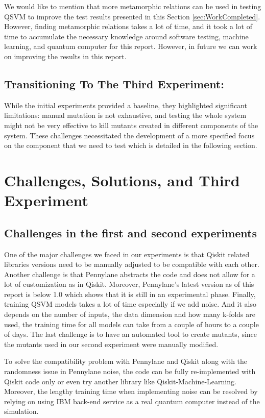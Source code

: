 \documentclass[12pt,a4paper]{article}
\begin{document}
We would like to mention that more metamorphic relations can be used in testing QSVM to improve the test results presented in this Section \ref{sec:WorkCompleted}. However, finding metamorphic relations takes a lot of time, and it took a lot of time to accumulate the necessary knowledge around software testing, machine learning, and quantum computer for this report. However, in future we can work on improving the results in this report.


	\subsection{Transitioning To The Third Experiment:} 

	While the initial experiments provided a baseline, they highlighted significant limitations: manual mutation is not exhaustive, and testing the whole system might not be very effective to kill mutants created in different components of the system. These challenges necessitated the development of a more specified focus on the component that we need to test which is detailed in the following section.
	

	\section{Challenges, Solutions, and Third Experiment}
	\label{sec:challenges_solutions}
	
	
	
	\subsection{Challenges in the first and second experiments}
	One of the major challenges we faced in our experiments is that Qiskit related libraries versions need to be manually adjusted to be compatible with each other. Another challenge is that Pennylane abstracts the code and does not allow for a lot of customization as in Qiskit. Moreover, Pennylane's latest version as of this report is below 1.0 which shows that it is still in an experimental phase. Finally, training QSVM models takes a lot of time especially if we add noise. And it also depends on the number of inputs, the data dimension and how many k-folds are used, the training time for all models can take from a couple of hours to a couple of days.	The last challenge is to have an automated tool to create mutants, since the mutants used in our second experiment were manually modified.
	
	To solve the compatibility problem with Pennylane and Qiskit along with the randomness issue in Pennylane noise, the code can be fully re-implemented with Qiskit code only or even try another library like Qiskit-Machine-Learning. Moreover, the lengthy training time when implementing noise can be resolved by relying on using IBM back-end service as a real quantum computer instead of the simulation.
	
\end{document}
